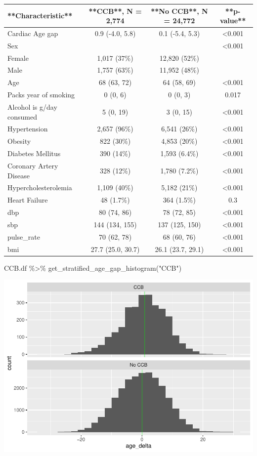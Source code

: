 \documentclass[
]{article}
\newenvironment{Shaded}{\begin{snugshade}}{\end{snugshade}}
\newcommand{\FunctionTok}[1]{\textcolor[rgb]{0.00,0.00,0.00}{#1}}
\newcommand{\NormalTok}[1]{#1}
\newcommand{\SpecialCharTok}[1]{\textcolor[rgb]{0.00,0.00,0.00}{#1}}
\newcommand{\StringTok}[1]{\textcolor[rgb]{0.31,0.60,0.02}{#1}}
\begin{document}
\begin{tabular}{l|c|c|c}
\hline
**Characteristic** & **CCB**, N = 2,774 & **No CCB**, N = 24,772 & **p-value**\\
\hline
Cardiac Age gap & 0.9 (-4.0, 5.8) & 0.1 (-5.4, 5.3) & <0.001\\
\hline
Sex &  &  & <0.001\\
\hline
Female & 1,017 (37\%) & 12,820 (52\%) & \\
\hline
Male & 1,757 (63\%) & 11,952 (48\%) & \\
\hline
Age & 68 (63, 72) & 64 (58, 69) & <0.001\\
\hline
Packs year of smoking & 0 (0, 6) & 0 (0, 3) & 0.017\\
\hline
Alcohol is g/day consumed & 5 (0, 19) & 3 (0, 15) & <0.001\\
\hline
Hypertension & 2,657 (96\%) & 6,541 (26\%) & <0.001\\
\hline
Obesity & 822 (30\%) & 4,853 (20\%) & <0.001\\
\hline
Diabetes Mellitus & 390 (14\%) & 1,593 (6.4\%) & <0.001\\
\hline
Coronary Artery Disease & 328 (12\%) & 1,780 (7.2\%) & <0.001\\
\hline
Hypercholesterolemia & 1,109 (40\%) & 5,182 (21\%) & <0.001\\
\hline
Heart Failure & 48 (1.7\%) & 364 (1.5\%) & 0.3\\
\hline
dbp & 80 (74, 86) & 78 (72, 85) & <0.001\\
\hline
sbp & 144 (134, 155) & 137 (125, 150) & <0.001\\
\hline
pulse\_rate & 70 (62, 78) & 68 (60, 76) & <0.001\\
\hline
bmi & 27.7 (25.0, 30.7) & 26.1 (23.7, 29.1) & <0.001\\
\hline
\end{tabular}

\begin{Shaded}
\begin{Highlighting}[]
\NormalTok{CCB.df }\SpecialCharTok{\%\textgreater{}\%} 
  \FunctionTok{get\_stratified\_age\_gap\_histogram}\NormalTok{(}\StringTok{"CCB"}\NormalTok{)}
\end{Highlighting}
\end{Shaded}

\includegraphics{../results/report_files/figure-latex/CCB-age-gap-histograms-1.pdf}
\end{document}
